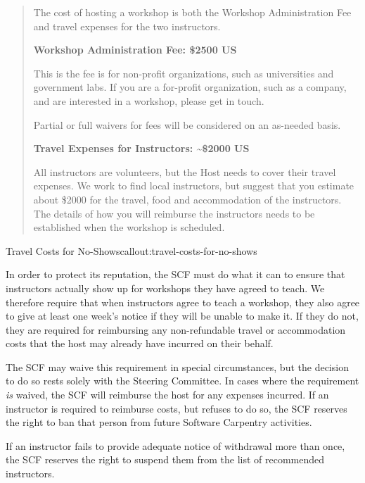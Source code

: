 \begin{quote}
The cost of hosting a workshop is both the Workshop Administration Fee
and travel expenses for the two instructors.

\textbf{Workshop Administration Fee: \$2500 US}

This is the fee is for non-profit organizations, such as universities
and government labs. If you are a for-profit organization, such as a
company, and are interested in a workshop, please get in touch.

Partial or full waivers for fees will be considered on an as-needed
basis.

\textbf{Travel Expenses for Instructors: \textasciitilde{}\$2000 US}

All instructors are volunteers, but the Host needs to cover their travel
expenses. We work to find local instructors, but suggest that you
estimate about \$2000 for the travel, food and accommodation of the
instructors. The details of how you will reimburse the instructors needs
to be established when the workshop is scheduled.
\end{quote}

\begin{callout}{Travel Costs for No-Shows}{callout:travel-costs-for-no-shows}

In order to protect its reputation, the SCF must do what it can to
ensure that instructors actually show up for workshops they have agreed
to teach. We therefore require that when instructors agree to teach a
workshop, they also agree to give at least one week's notice if they
will be unable to make it. If they do not, they are required for
reimbursing any non-refundable travel or accommodation costs that the
host may already have incurred on their behalf.

The SCF may waive this requirement in special circumstances, but the
decision to do so rests solely with the Steering Committee. In cases
where the requirement \emph{is} waived, the SCF will reimburse the host
for any expenses incurred. If an instructor is required to reimburse
costs, but refuses to do so, the SCF reserves the right to ban that
person from future Software Carpentry activities.

If an instructor fails to provide adequate notice of withdrawal more
than once, the SCF reserves the right to suspend them from the list of
recommended instructors.
\end{callout}


